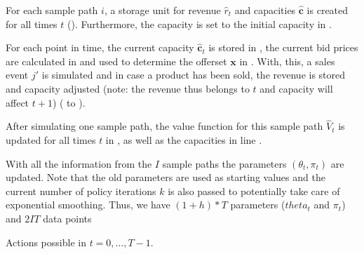 For each sample path $i$, a storage unit for revenue $\hat{r}_t$ and capacities $\mathbf{\hat{c}}$ is created for all times $t$ (). Furthermore, the capacity is set to the initial capacity in .

For each point in time, the current capacity $\mathbf{\hat{c}}_t$ is stored in , the current bid prices are calculated in  and used to determine the offerset $\mathbf{x}$ in . With, this, a sales event $j'$ is simulated and in case a product has been sold, the revenue is stored and capacity adjusted (note: the revenue thus belongs to $t$ and capacity will affect $t+1$) ( to ).

After simulating one sample path, the value function for this sample path $\hat{V}_t$ is updated for all times $t$ in , as well as the capacities in line .

With all the information from the $I$ sample paths the parameters $\left(\theta_t, \pi_t \right)$ are updated. Note that the old parameters are used as starting values and the current number of policy iterations $k$ is also passed to potentially take care of exponential smoothing. Thus, we have $(1+h)*T$ parameters ($theta_t$ and $\pi_t$) and $2IT$ data points

Actions possible in $t = 0, \dots, T-1$.


